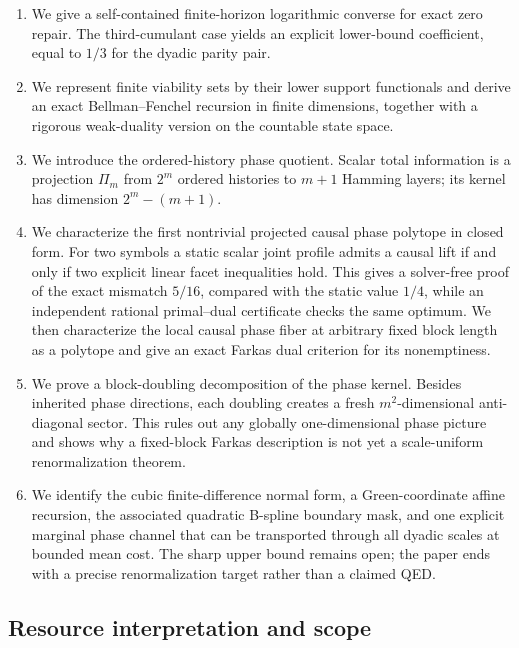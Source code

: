 \documentclass[11pt,a4paper]{article}
\theoremstyle{definition}
\theoremstyle{remark}
\begin{document}
\begin{enumerate}
\item We give a self-contained finite-horizon logarithmic converse for exact
zero repair.  The third-cumulant case yields an explicit lower-bound coefficient, equal to
\(1/3\) for the dyadic parity pair.

\item We represent finite viability sets by their lower support functionals and
derive an exact Bellman--Fenchel recursion in finite dimensions, together with
a rigorous weak-duality version on the countable state space.

\item We introduce the ordered-history phase quotient.  Scalar total
information is a projection \(\Pi_m\) from \(2^m\) ordered histories to
\(m+1\) Hamming layers; its kernel has dimension \(2^m-(m+1)\).

\item We characterize the first nontrivial projected causal phase polytope in
closed form.  For two symbols a static scalar joint profile admits a causal
lift if and only if two explicit linear facet inequalities hold.  This gives a
solver-free proof of the exact mismatch \(5/16\), compared with the static
value \(1/4\), while an independent rational primal--dual certificate checks
the same optimum.  We then characterize the local causal phase fiber at
arbitrary fixed block length as a polytope and give an exact Farkas dual
criterion for its nonemptiness.

\item We prove a block-doubling decomposition of the phase kernel.  Besides
inherited phase directions, each doubling creates a fresh \(m^2\)-dimensional
anti-diagonal sector.  This rules out any globally one-dimensional phase
picture and shows why a fixed-block Farkas description is not yet a
scale-uniform renormalization theorem.

\item We identify the cubic finite-difference normal form, a Green-coordinate
affine recursion, the associated quadratic B-spline boundary mask, and one
explicit marginal phase channel that can be transported through all dyadic
scales at bounded mean cost.  The sharp upper bound remains open; the paper
ends with a precise renormalization target rather than a claimed QED.
\end{enumerate}

\subsection{Resource interpretation and scope}
\end{document}
